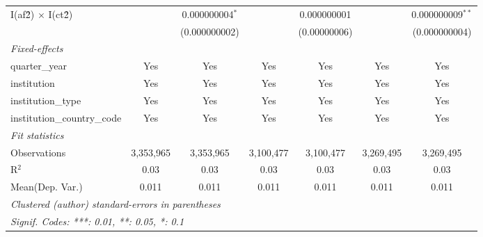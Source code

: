 \begin{tabular}{lcccccc}
   I(af\^2) $\times$ I(ct\^2)         &                & 0.000000004$^{*}$ &                & 0.000000001     &                & 0.000000009$^{**}$\\   
                                      &                & (0.000000002)     &                & (0.00000006)    &                & (0.000000004)\\   
   \midrule
   \emph{Fixed-effects}\\
   quarter\_year                      & Yes            & Yes               & Yes            & Yes             & Yes            & Yes\\  
   institution                        & Yes            & Yes               & Yes            & Yes             & Yes            & Yes\\  
   institution\_type                  & Yes            & Yes               & Yes            & Yes             & Yes            & Yes\\  
   institution\_country\_code         & Yes            & Yes               & Yes            & Yes             & Yes            & Yes\\  
   \midrule
   \emph{Fit statistics}\\
   Observations                       & 3,353,965      & 3,353,965         & 3,100,477      & 3,100,477       & 3,269,495      & 3,269,495\\  
   R$^2$                              & 0.03           & 0.03              & 0.03           & 0.03            & 0.03           & 0.03\\  
Mean(Dep. Var.) & 0.011 & 0.011 & 0.011 & 0.011 & 0.011 & 0.011 \\
   \midrule \midrule
   \multicolumn{7}{l}{\emph{Clustered (author) standard-errors in parentheses}}\\
   \multicolumn{7}{l}{\emph{Signif. Codes: ***: 0.01, **: 0.05, *: 0.1}}\\
\end{tabular}
\par\endgroup
